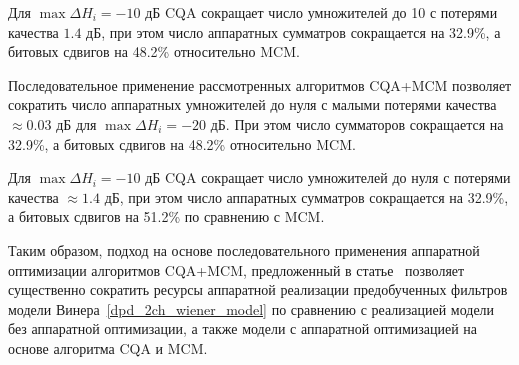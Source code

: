 Для $\max \Delta H_i=-10$ дБ CQA сокращает число умножителей до 10 с потерями качества $1.4$ дБ, при этом число аппаратных сумматров сокращается на 32.9\%, а битовых сдвигов на 48.2\% относительно MCM. 

Последовательное применение рассмотренных алгоритмов CQA+MCM позволяет сократить число аппаратных умножителей до нуля с малыми потерями качества $\approx0.03$ дБ для $\max \Delta H_i=-20$ дБ. При этом число сумматоров сокращается на 32.9\%, а битовых сдвигов на 48.2\% относительно MCM. 

Для $\max \Delta H_i=-10$ дБ CQA сокращает число умножителей до нуля с потерями качества $\approx1.4$ дБ, при этом число аппаратных сумматров сокращается на 32.9\%, а битовых сдвигов на 51.2\% по сравнению с MCM. 

Таким образом, подход на основе последовательного применения аппаратной оптимизации алгоритмов CQA+MCM, предложенный в статье~\cite{Bakholdin2025} позволяет существенно сократить ресурсы аппаратной реализации предобученных фильтров модели Винера~\eqref{dpd_2ch_wiener_model} по сравнению с реализацией модели без аппаратной оптимизации, а также модели с аппаратной оптимизацией на основе алгоритма CQA и MCM.